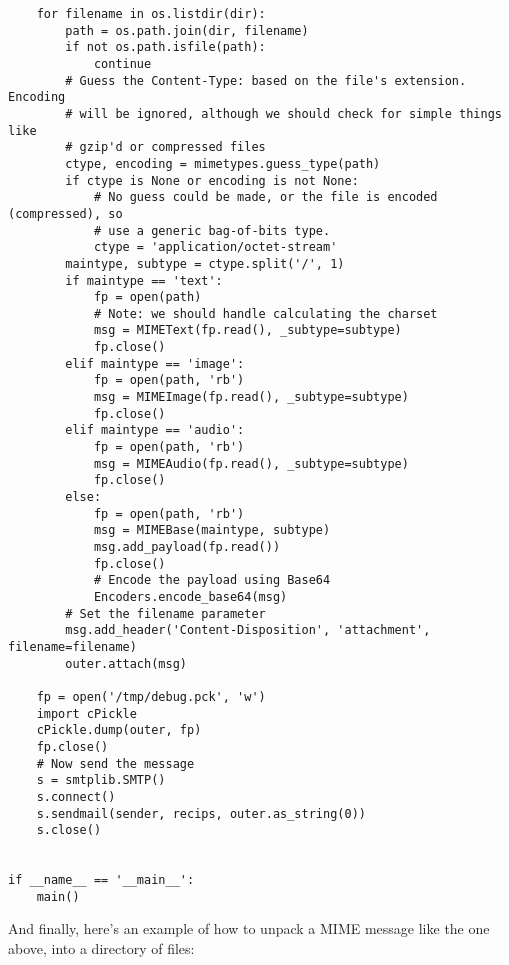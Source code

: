\begin{verbatim}
    for filename in os.listdir(dir):
        path = os.path.join(dir, filename)
        if not os.path.isfile(path):
            continue
        # Guess the Content-Type: based on the file's extension.  Encoding
        # will be ignored, although we should check for simple things like
        # gzip'd or compressed files
        ctype, encoding = mimetypes.guess_type(path)
        if ctype is None or encoding is not None:
            # No guess could be made, or the file is encoded (compressed), so
            # use a generic bag-of-bits type.
            ctype = 'application/octet-stream'
        maintype, subtype = ctype.split('/', 1)
        if maintype == 'text':
            fp = open(path)
            # Note: we should handle calculating the charset
            msg = MIMEText(fp.read(), _subtype=subtype)
            fp.close()
        elif maintype == 'image':
            fp = open(path, 'rb')
            msg = MIMEImage(fp.read(), _subtype=subtype)
            fp.close()
        elif maintype == 'audio':
            fp = open(path, 'rb')
            msg = MIMEAudio(fp.read(), _subtype=subtype)
            fp.close()
        else:
            fp = open(path, 'rb')
            msg = MIMEBase(maintype, subtype)
            msg.add_payload(fp.read())
            fp.close()
            # Encode the payload using Base64
            Encoders.encode_base64(msg)
        # Set the filename parameter
        msg.add_header('Content-Disposition', 'attachment', filename=filename)
        outer.attach(msg)

    fp = open('/tmp/debug.pck', 'w')
    import cPickle
    cPickle.dump(outer, fp)
    fp.close()
    # Now send the message
    s = smtplib.SMTP()
    s.connect()
    s.sendmail(sender, recips, outer.as_string(0))
    s.close()


if __name__ == '__main__':
    main()
\end{verbatim}

And finally, here's an example of how to unpack a MIME message like
the one above, into a directory of files:

